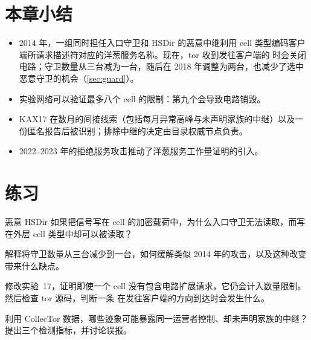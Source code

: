\section*{本章小结}
\begin{itemize}
  \item 2014 年，一组同时担任入口守卫和 HSDir 的恶意中继利用 cell 类型编码客户端所请求描述符对应的洋葱服务名称。现在，tor 收到发往客户端的  时会关闭电路；守卫数量从三台减为一台，随后在 2018 年调整为两台，也减少了选中恶意守卫的机会（\cref{sec:guard}）。
  \item 实验网络可以验证最多八个  cell 的限制：第九个会导致电路销毁。
  \item KAX17 在数月的间接线索（包括每月异常高峰与未声明家族的中继）以及一份匿名报告后被识别；排除中继的决定由目录权威节点负责。
  \item 2022--2023 年的拒绝服务攻击推动了洋葱服务工作量证明的引入。
\end{itemize}

\section*{练习}

\begin{esercizio}[1]\label{es:27-campo}
恶意 HSDir 如果把信号写在 cell 的加密载荷中，为什么入口守卫无法读取，而写在外层 cell 类型中却可以被读取？
\end{esercizio}

\begin{esercizio}[1]\label{es:27-uno}
解释将守卫数量从三台减少到一台，如何缓解类似 2014 年的攻击，以及这种改变带来什么缺点。
\end{esercizio}

\begin{esercizio}[2]\label{es:27-verso}
修改实验~17，证明即使一个  cell 没有包含电路扩展请求，它仍会计入数量限制。然后检查 tor 源码，判断一条  在发往客户端的方向到达时会发生什么。
\end{esercizio}

\begin{esercizio}[2]\label{es:27-segnali}
利用 CollecTor 数据，哪些迹象可能暴露同一运营者控制、却未声明家族的中继？提出三个检测指标，并讨论误报。
\end{esercizio}

